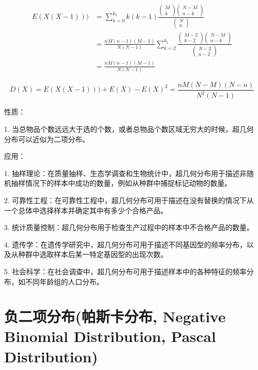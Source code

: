 \documentclass[12pt, a4paper, oneside]{ctexbook}
\begin{document}
$$
\begin{aligned}
E(X(X - 1))) &= \sum\limits_{k = 0}^{k_1} k(k - 1) \frac{\begin{pmatrix}M \\k \end{pmatrix} \begin{pmatrix} N - M \\ n - k\end{pmatrix}}{\begin{pmatrix} N \\ n\end{pmatrix}} \\
&= \frac{nM(n - 1)(M - 1)}{N(N - 1)} \sum\limits_{k = 2}^{k_1} \frac{\begin{pmatrix} M - 2 \\ k - 2\end{pmatrix} \begin{pmatrix} N - M \\ n - k\end{pmatrix}}{\begin{pmatrix} N - 2 \\ n - 2\end{pmatrix}} \\
&= \frac{nM(n - 1)(M - 1)}{N(N - 1)}
\end{aligned}
$$

$$
D(X) = E(X(X - 1))) + E(X) - E(X)^{2}  = \frac{nM(N - M)(N - n)}{N^{2}(N - 1)}
$$

 性质：

1. 当总物品个数远远大于选的个数，或者总物品个数区域无穷大的时候，超几何分布可以近似为二项分布。

 应用：

1. 抽样理论：在质量抽样、生态学调查和生物统计中，超几何分布用于描述非随机抽样情况下的样本中成功的数量，例如从种群中捕捉标记动物的数量。

2. 可靠性工程：在可靠性工程中，超几何分布可用于描述在没有替换的情况下从一个总体中选择样本并确定其中有多少个合格产品。

3. 统计质量控制：超几何分布用于检查生产过程中的样本中不合格产品的数量。

4. 遗传学：在遗传学研究中，超几何分布可用于描述不同基因型的频率分布，以及从种群中选取样本后某一特定基因型的出现次数。

5. 社会科学：在社会调查中，超几何分布可用于描述样本中的各种特征的频率分布，如不同年龄组的人口分布。

\section{负二项分布(帕斯卡分布, Negative Binomial Distribution, Pascal Distribution)}
\end{document}
